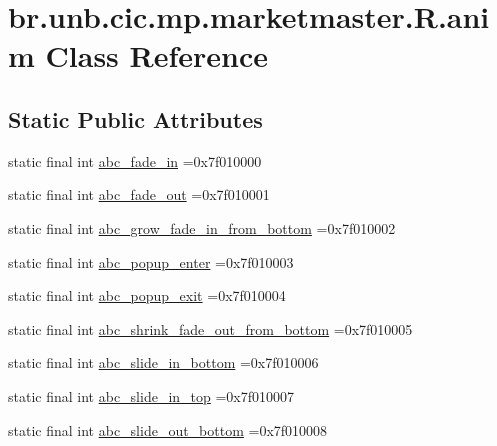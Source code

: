 \hypertarget{classbr_1_1unb_1_1cic_1_1mp_1_1marketmaster_1_1R_1_1anim}{}\section{br.\+unb.\+cic.\+mp.\+marketmaster.\+R.\+anim Class Reference}
\label{classbr_1_1unb_1_1cic_1_1mp_1_1marketmaster_1_1R_1_1anim}
\subsection*{Static Public Attributes}
\begin{DoxyCompactItemize}
\item 
static final int \mbox{\hyperlink{classbr_1_1unb_1_1cic_1_1mp_1_1marketmaster_1_1R_1_1anim_afd9b1d23ef3072fcd1d7bad946c28fe3}{abc\+\_\+fade\+\_\+in}} =0x7f010000
\item 
static final int \mbox{\hyperlink{classbr_1_1unb_1_1cic_1_1mp_1_1marketmaster_1_1R_1_1anim_ae853bac80bfe1ce4352b2448af2fdaa0}{abc\+\_\+fade\+\_\+out}} =0x7f010001
\item 
static final int \mbox{\hyperlink{classbr_1_1unb_1_1cic_1_1mp_1_1marketmaster_1_1R_1_1anim_afd9048ac1b04f6f20abd352a9afa023e}{abc\+\_\+grow\+\_\+fade\+\_\+in\+\_\+from\+\_\+bottom}} =0x7f010002
\item 
static final int \mbox{\hyperlink{classbr_1_1unb_1_1cic_1_1mp_1_1marketmaster_1_1R_1_1anim_a08b65f2d6d11a3241c1f6d800c27e9ea}{abc\+\_\+popup\+\_\+enter}} =0x7f010003
\item 
static final int \mbox{\hyperlink{classbr_1_1unb_1_1cic_1_1mp_1_1marketmaster_1_1R_1_1anim_adccfa4e7e6ebba3b36629bd55887e03f}{abc\+\_\+popup\+\_\+exit}} =0x7f010004
\item 
static final int \mbox{\hyperlink{classbr_1_1unb_1_1cic_1_1mp_1_1marketmaster_1_1R_1_1anim_a46020b165428d8535386eb5199a1ab8e}{abc\+\_\+shrink\+\_\+fade\+\_\+out\+\_\+from\+\_\+bottom}} =0x7f010005
\item 
static final int \mbox{\hyperlink{classbr_1_1unb_1_1cic_1_1mp_1_1marketmaster_1_1R_1_1anim_a3306d03af073dabca1007332b3307fcf}{abc\+\_\+slide\+\_\+in\+\_\+bottom}} =0x7f010006
\item 
static final int \mbox{\hyperlink{classbr_1_1unb_1_1cic_1_1mp_1_1marketmaster_1_1R_1_1anim_a99c196b769736c619ae4cb1313d7cf17}{abc\+\_\+slide\+\_\+in\+\_\+top}} =0x7f010007
\item 
static final int \mbox{\hyperlink{classbr_1_1unb_1_1cic_1_1mp_1_1marketmaster_1_1R_1_1anim_a5e596cb194afe7d26a80acd6d837daeb}{abc\+\_\+slide\+\_\+out\+\_\+bottom}} =0x7f010008

\end{DoxyCompactItemize}
